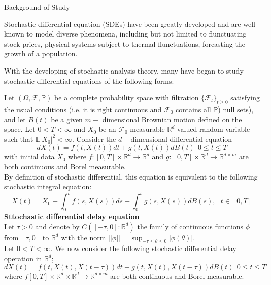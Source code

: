 \documentclass[unknownkeysallowed, compress]{beamer}
\theoremstyle{plain}
\begin{document}
\begin{frame}[allowframebreaks]{Background of Study}
\par Stochastic differential equation (SDEs) have been greatly developed and are well known to model diverse  phenomena, including but not limited to flunctuating stock prices, physical systems subject to thermal flunctuations, forcasting the growth of a population.\\
\par With the developing of stochastic analysis theory, many have began to study stochastic differential equations of the following forms:\\
\par Let $(\Omega,\mathcal{F},\mathbb{P})$ be a complete probability space with filtration $\{\mathcal{F}_t\}_{t\geq 0}$ satisfying the usual conditions (i.e. it is right continuous and $\mathcal{F}_0$ contains all $\mathbb{P}$) null sets), and let $B(t)$ be a given $m-$ dimensional Brownian motion defined on the space. Let $0<T<\infty$ and $X_0$ be an $\mathcal{F}_0$-measurable $\mathbb{R}^d$-valued random variable such that $\mathbb{E}|X_0|^2<\infty$. Consider the $d-$dimensional differential equation
\begin{equation}\label{new1.11}
dX(t) = f(t,X(t))dt+g(t,X(t))dB(t)~~0\leq t\leq T
\end{equation}
with initial data $X_0$ where $f:[0,T]\times \mathbb{R}^d\longrightarrow \mathbb{R}^d$ and $g:[0,T]\times \mathbb{R}^d\longrightarrow \mathbb{R}^{d\times m}$ are both continuous and Borel measurable.\\
 By definition of stochastic differential, this equation is equivalent to the following stochastic integral equation:
 \begin{equation}\label{new1.12}
     X(t) = X_0+\int_0^t f(s,X(s))ds+\int_0^tg(s,X(s))dB(s),~~~t\in[0,T]
 \end{equation}
\textbf{Sttochastic differential delay equation}\\
Let $\tau>0$ and denote by $C([-\tau,0]:\mathbb{R}^d)$ the family of continuous functions $\phi$ from $[\tau,0]$ to $\mathbb{R}^d$ with the norm $||\phi|| = \sup_{-\tau\leq \theta\leq 0}|\phi(\theta)|$.\\
Let $0<T<\infty$. We now consider the following stochastic differential delay operation in $\mathbb{R}^d$;
\begin{equation}\label{new1.13}
dX(t) = f(t,X(t), X(t-\tau))dt+g(t,X(t),X(t-\tau))dB(t)~~0\leq t\leq T
\end{equation}
where $f[0,T]\times\mathbb{R}^d\times\mathbb{R}^d\rightarrow \mathbb{R}^{d\times m}$ are both continuous and Borel measurable.\\

\end{frame}
\end{document}

